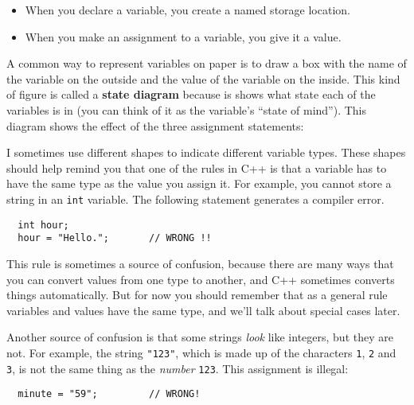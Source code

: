 \begin{itemize}

\item When you declare a variable, you create a named storage location.

\item When you make an assignment to a variable, you give it a value.

\end{itemize}

A common way to represent variables on paper is to draw a box
with the name of the variable on the outside and the value
of the variable on the inside.  This kind of figure is called
a {\bf state diagram} because is shows what state each of the
variables is in (you can think of it as the variable's ``state of
mind'').
This diagram shows
the effect of the three assignment statements:

\vspace{0.1in}
\centerline{}
\vspace{0.1in}

I sometimes use different shapes to indicate different
variable types.  These shapes should help remind you that one of the
rules in C++ is that a variable has to have the same type as the
value you assign it.  For example, you cannot store a string in
an {\tt int} variable.  The following statement generates a compiler
error.

\begin{mdframed}

\begin{verbatim}
  int hour;
  hour = "Hello.";       // WRONG !!
\end{verbatim}

\end{mdframed}
%
This rule is sometimes a source of confusion, because there are many
ways that you can convert values from one type to another, and C++
sometimes converts things automatically.  But for now you should
remember that as a general rule variables and values have the same
type, and we'll talk about special cases later.

Another source of confusion is that some strings {\em look}
like integers, but they are not.  For example,
the string {\tt "123"}, which is made up of the
characters {\tt 1}, {\tt 2} and {\tt 3}, is not
the same thing as the {\em number} {\tt 123}.
This assignment is illegal:

\begin{verbatim}
  minute = "59";         // WRONG!
\end{verbatim}
%
